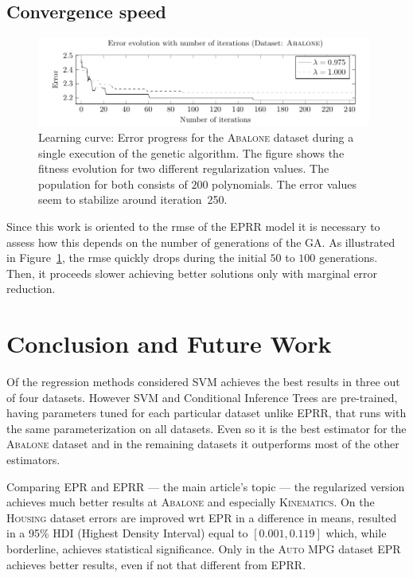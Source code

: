 \documentclass[times,review,preprint]{elsarticle}
\begin{document}
\subsection{Convergence speed}
%
\begin{figure}[tb]
\begin{center}
\includegraphics[width=0.98\textwidth]{figure_4.pdf}
\caption{Learning curve: Error progress for the \textsc{Abalone} dataset during a single execution of the genetic algorithm. The figure shows the fitness evolution for two different regularization values. The population for both consists of $200$ polynomials. The error values seem to stabilize around iteration~250.}
\label{Abalone_fitnessProgress}
\end{center}
\end{figure}
%
Since this work is oriented to the \ac{rmse} of the \ac{EPRR} model it is necessary to assess how this depends on the number of generations of the \ac{GA}. As illustrated in Figure~\ref{Abalone_fitnessProgress}, the \ac{rmse} quickly drops during the initial $50$ to $100$ generations. Then, it proceeds slower achieving better solutions only with marginal error reduction.

\section{Conclusion and Future Work}

Of the regression methods considered \ac{SVM} achieves the best results in three out of four datasets. However \ac{SVM} and Conditional Inference Trees are pre-trained, having parameters tuned for each particular dataset unlike \ac{EPRR}, that runs with the same parameterization on all datasets. Even so it is the best estimator for the \textsc{Abalone} dataset and in the remaining datasets it outperforms most of the other estimators. 

Comparing \ac{EPR} and \ac{EPRR} --- the main article's topic --- the regularized version achieves much better results at \textsc{Abalone} and especially \textsc{Kinematics}. On the \textsc{Housing} dataset errors are improved  wrt \ac{EPR} in a difference in means, resulted in a 95\% HDI (Highest Density Interval) equal to $\left\lbrack 0.001, 0.119 \right\rbrack$ which, while borderline, achieves statistical significance. Only in the \textsc{Auto MPG} dataset \ac{EPR} achieves better results, even if not that different from \ac{EPRR}.
\end{document}
